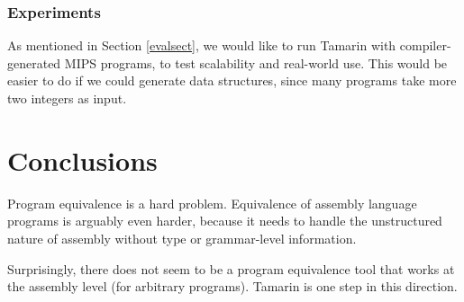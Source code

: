 \documentclass{llncs}
\begin{document}
\subsubsection{Experiments} As mentioned in Section \ref{evalsect}, we would like to run Tamarin with compiler-generated MIPS programs, to test scalability and real-world use. This would be easier to do if we could generate data structures, since many programs take more two integers as input.

\section{Conclusions}

Program equivalence is a hard problem. Equivalence of assembly language programs is arguably even harder, because it needs to handle the unstructured nature of assembly without type or grammar-level information.

Surprisingly, there does not seem to be a program equivalence tool that works at the assembly level (for arbitrary programs). Tamarin is one step in this direction. 





\end{document}
